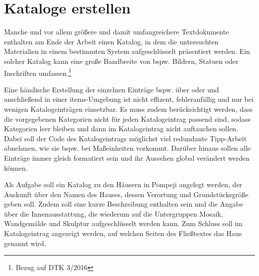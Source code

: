 \chapter{Kataloge erstellen}
Manche und vor allem größere und damit umfangreichere Textdokumente enthalten am Ende der Arbeit einen Katalog, 
in dem die untersuchten Materialien in einem bestimmten System aufgeschlüsselt präsentiert werden.
Ein solcher Katalog kann eine große Bandbreite von bspw.  Bildern, Statuen oder Inschriften umfassen.\footnote{Bezug auf DTK 3/2016}

Eine händische Erstellung der einzelnen Einträge bspw. über  oder  
und anschließend in einer {items}-Umgebung ist nicht effizent, fehleranfällig und nur bei wenigen Katalogeinträgen einsetzbar.
Es muss zudem berücksichtigt werden, dass  die vorgegebenen Kategorien nicht für jeden Katalogeintrag passend sind, 
sodass  Kategorien leer bleiben  und dann im Katalogeintrag nicht auftauchen sollen.
Dabei soll der Code des Katalogeintrags möglichst viel redundante Tipp-Arbeit abnehmen, wie sie bspw. bei Maßeinheiten vorkommt.
Darüber hinaus sollen alle Einträge immer gleich formatiert sein und ihr Aussehen global verändert werden können.

Als Aufgabe soll ein Katalog zu den Häusern in Pompeji angelegt werden,
der Auskunft über den Namen des Hauses, dessen Verortung und Grundstücksgröße  geben soll.
Zudem soll eine kurze Beschreibung enthalten sein und die Angabe über die Innenausstattung, 
die wiederum auf die Untergruppen Mosaik, Wandgemälde und Skulptur aufgeschlüsselt werden kann. 
Zum Schluss soll im Katalogeintrag angezeigt werden, 
auf welchen Seiten des Fließtextes das Haus genannt wird.

